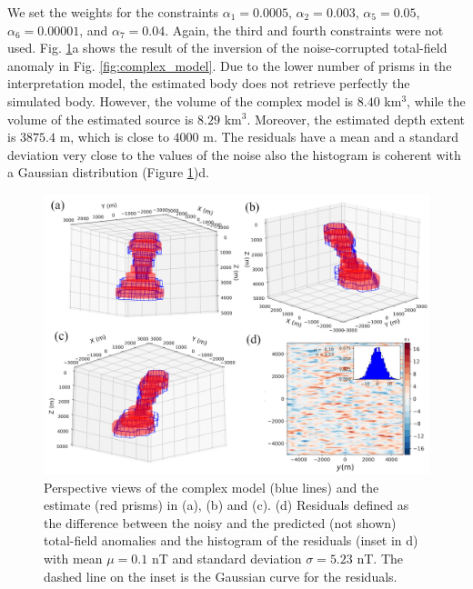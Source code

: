 \documentclass[extra,mreferee]{gji}
\begin{document}
We set the weights for the constraints $\alpha_1 = 0.0005$, $\alpha_2 = 0.003$, $\alpha_5 = 0.05$, $\alpha_6 = 0.00001$, and $\alpha_7 = 0.04$. Again, the third and fourth constraints were not used. Fig. \ref{fig:complex_result}a shows the result of the inversion of the noise-corrupted total-field anomaly in Fig. \ref{fig:complex_model}. Due to the lower number of prisms in the interpretation model, the estimated body does not retrieve perfectly the simulated body. However, the volume of the complex model is $8.40$ km$^3$, while the volume of the estimated source is $8.29$ km$^3$. Moreover, the estimated depth extent is $3875.4$ m, which is close to $4000$ m. The residuals have a mean and a standard deviation very close to the values of the noise also the histogram is coherent with a Gaussian distribution (Figure \ref{fig:complex_result})d.

\begin{figure}
    \centering
    \includegraphics[scale=.75]{figures/complex_estimates_residual.png}
    \caption{Perspective views of the complex model (blue lines) and the estimate (red prisms) in (a), (b) and (c). (d) Residuals defined as the difference between the noisy and the predicted (not shown) total-field anomalies and the histogram of the residuals (inset in d) with mean $\mu=0.1$ nT and standard deviation $\sigma=5.23$ nT. The dashed line on the inset is the Gaussian curve for the residuals.
}
    \label{fig:complex_result}
\end{figure}


\end{document}
